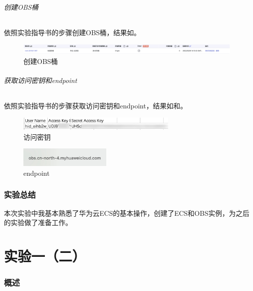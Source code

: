 \documentclass[lang=cn,11pt,a4paper,cite=authornum]{paper}
\begin{document}
\paragraph{创建OBS桶}

依照实验指导书的步骤创建OBS桶，结果如。

\begin{figure}[!htb]
    \centering
    \includegraphics[width=\textwidth]{./images/OBS.jpg}
    \caption{创建OBS桶\label{fig:OBS}}
\end{figure}

\paragraph{获取访问密钥和endpoint}

依照实验指导书的步骤获取访问密钥和endpoint，结果如和。

\begin{figure}[!htb]
    \centering
    \includegraphics[width=0.7\textwidth]{./images/key.jpg}
    \caption{访问密钥\label{fig:key}}
\end{figure}

\begin{figure}[!htb]
    \centering
    \includegraphics[width=0.4\textwidth]{./images/endpoint.jpg}
    \caption{endpoint\label{fig:endpoint}}
\end{figure}

\section{实验总结}

本次实验中我基本熟悉了华为云ECS的基本操作，创建了ECS和OBS实例，为之后的实验做了准备工作。

\part{实验一（二）}

\section{概述}
\end{document}
